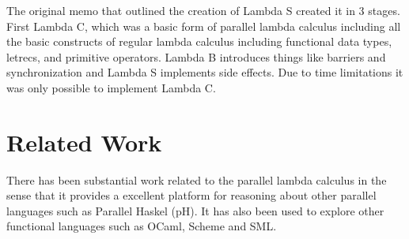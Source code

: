 \documentclass[preprint]{sigplanconf}
\begin{document}
The original memo that outlined the creation of Lambda S created it in 3 stages. First Lambda C, which was a basic form of parallel lambda calculus including all the basic constructs of regular lambda calculus including functional data types, letrecs, and primitive operators. Lambda B introduces things like barriers and synchronization and Lambda S implements side effects.  Due to time limitations it was only possible to implement Lambda C. 

\section{Related Work}
There has been substantial work related to the parallel lambda calculus in the sense that it provides a excellent platform for reasoning about other parallel languages such as Parallel Haskel (pH). It has also been used to explore other functional languages such as OCaml, Scheme and SML. 
\end{document}
